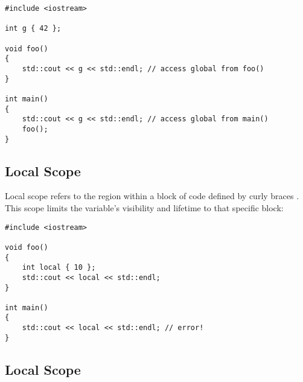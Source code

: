 \begin{lstlisting}[style=cxx]
#include <iostream>

int g { 42 };

void foo()
{
    std::cout << g << std::endl; // access global from foo()
}

int main()
{
    std::cout << g << std::endl; // access global from main()
    foo();
}
\end{lstlisting}

\subsection{Local Scope}

\noindent
Local scope refers to the region within a block of code defined by curly braces \inlinecxx{\{\}}.
This scope limits the variable's visibility and lifetime to that specific block:

\begin{lstlisting}[style=cxx]
#include <iostream>

void foo()
{
    int local { 10 };
    std::cout << local << std::endl;
}

int main()
{
    std::cout << local << std::endl; // error!
}
\end{lstlisting}

\subsection{Local Scope}
